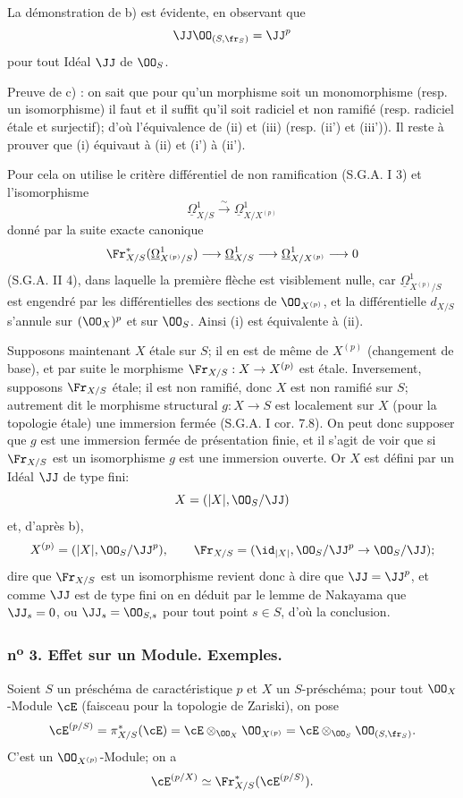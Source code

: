 La démonstration de b) est évidente, en observant que
\[
\JJ\OO_{(S,\fr_S)}=\JJ^p
\]
pour tout Idéal $\JJ$ de $\OO_S$.

Preuve de c) : on sait que pour qu'un morphisme soit un
monomorphisme (resp. un isomorphisme) il faut et il suffit qu'il soit radiciel et non ramifié (resp. radiciel étale et surjectif); d'où l'équivalence de (ii) et (iii) (resp. (ii') et (iii')). Il reste à prouver que (i) équivaut à (ii) et (i') à (ii').

Pour cela on utilise le critère différentiel de non ramification (S.G.A. I 3) et l'isomorphisme
\[
\underline{\Omega}^1_{X/S}\xrightarrow{\sim} \underline{\Omega}^1_{X/X^{(p)}}
\]
donné par la suite exacte canonique
\[
\Fr_{X/S}^*(\underline{\Omega}^1_{X^{(p)}/S})\longrightarrow \underline{\Omega}^1_{X/S}
\longrightarrow \underline{\Omega}^1_{X/X^{(p)}}\longrightarrow 0
\]
(S.G.A. II 4), dans laquelle la première flèche est visiblement nulle, car $\underline{\Omega}^1_{X^{(p)}/S}$ est engendré par les différentielles des sections de $\OO_{X^{(p)}}$, et la différentielle $d_{X/S}$ s'annule sur $(\OO_X)^p$ et sur $\OO_S$. Ainsi (i) est équivalente à (ii).

Supposons maintenant $X$ étale sur $S$; il en est de même de $X^{(p)}$ (changement de base), et par suite le morphisme $\Fr_{X/S}:X\to X^{(p)}$ est étale. Inversement, supposons $\Fr_{X/S}$ étale; il est non ramifié, donc $X$ est non ramifié sur $S$; autrement dit le morphisme structural $g:X\to S$ est localement sur $X$ (pour la topologie étale) une immersion fermée (S.G.A. I cor. 7.8). On peut donc supposer que $g$ est une immersion fermée de présentation finie, et il s'agit de voir que si $\Fr_{X/S}$ est un isomorphisme $g$ est une immersion ouverte. Or $X$ est défini par un Idéal $\JJ$ de type fini:
\[
X=(|X|,\OO_S/\JJ)
\]
et, d'après b),
\[
X^{(p)}=(|X|,\OO_S/\JJ^p),
\qquad
\Fr_{X/S}=(\id_{|X|},\OO_S/\JJ^p\to\OO_S/\JJ);
\]
dire que $\Fr_{X/S}$ est un isomorphisme revient donc à dire que $\JJ=\JJ^p$, et comme $\JJ$ est de type fini on en déduit par le lemme de Nakayama que $\JJ_s=0$, ou $\JJ_s=\OO_{S,s}$ pour tout point $s\in S$, d'où la conclusion.

\subsubsection*{n\textsuperscript{o} 3. Effet sur un Module. Exemples.}

Soient $S$ un préschéma de caractéristique $p$ et $X$ un $S$-préschéma; pour tout $\OO_X$-Module $\cE$ (faisceau pour la topologie de Zariski), on pose
\[
\cE^{(p/S)}=\pi_{X/S}^*(\cE)=\cE\otimes_{\OO_X}\OO_{X^{(p)}}
 =\cE\otimes_{\OO_S}\OO_{(S,\fr_S)}.
\]
C'est un $\OO_{X^{(p)}}$-Module; on a
\[
\cE^{(p/X)}\simeq \Fr_{X/S}^*(\cE^{(p/S)}).
\]


